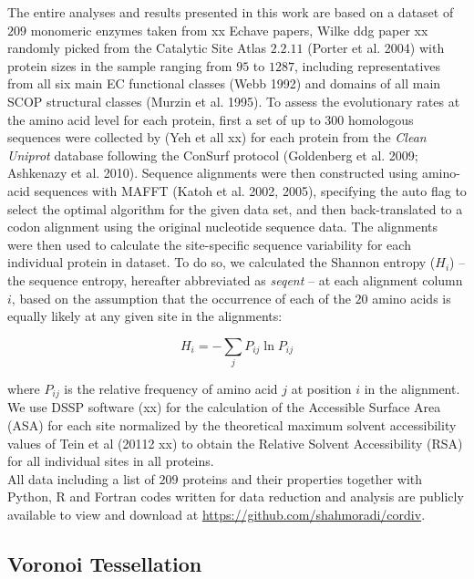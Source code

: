 \documentclass[11pt]{article}
\begin{document}
        The entire analyses and results presented in this work are based on a dataset of $209$ monomeric enzymes taken from xx Echave papers, Wilke ddg paper xx randomly picked from the Catalytic Site Atlas $2.2.11$ (Porter et al. 2004) with protein sizes in the sample ranging from $95$ to $1287$, including representatives from all six main EC functional classes (Webb 1992) and domains of all main SCOP structural classes (Murzin et al. 1995). To assess the evolutionary rates at the amino acid level for each protein, first a set of up to $300$ homologous sequences were collected by (Yeh et all xx) for each protein from the {\it Clean Uniprot} database following the ConSurf protocol (Goldenberg et al. 2009; Ashkenazy et al. 2010). Sequence alignments were then constructed using amino-acid sequences with MAFFT (Katoh et al. 2002, 2005), specifying the auto flag to select the optimal algorithm for the given data set, and then back-translated to a codon alignment using the original nucleotide sequence data. The alignments were then used to calculate the site-specific sequence variability for each individual protein in dataset. To do so, we calculated the Shannon entropy ($H_i$) -- the sequence entropy, hereafter abbreviated as {\it seqent} -- at each alignment column $i$, based on the assumption that the occurrence of each of the $20$ amino acids is equally likely at any given site in the alignments:

        \begin{equation}
            \label{eqn:shannon}
            H_i = -\sum_j P_{ij}\ln P_{ij}
        \end{equation}

        where $P_{ij}$ is the relative frequency of amino acid $j$ at position $i$ in the alignment. We use DSSP software (xx) for the calculation of the Accessible Surface Area (ASA) for each site normalized by the theoretical maximum solvent accessibility values of Tein et al (20112 xx) to obtain the Relative Solvent Accessibility (RSA) for all individual sites in all proteins. \\

        All data including a list of $209$ proteins and their properties together with Python, R and Fortran codes written for data reduction and analysis are publicly available to view and download at \url{https://github.com/shahmoradi/cordiv}.

    \subsection*{Voronoi Tessellation}
\end{document}

